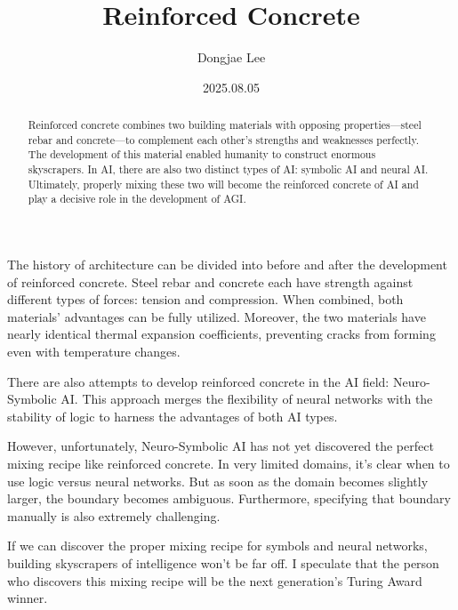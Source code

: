 \documentclass[11pt, oneside]{article}
\title{Reinforced Concrete}
\author{Dongjae Lee}
\date{2025.08.05}
\begin{document}
\maketitle
\begin{abstract}
	Reinforced concrete combines two building materials with opposing properties—steel rebar and concrete—to complement each other's strengths and weaknesses perfectly.
	The development of this material enabled humanity to construct enormous skyscrapers.
	In AI, there are also two distinct types of AI: symbolic AI and neural AI.
	Ultimately, properly mixing these two will become the reinforced concrete of AI and play a decisive role in the development of AGI.
\end{abstract}

The history of architecture can be divided into before and after the development of reinforced concrete.
Steel rebar and concrete each have strength against different types of forces: tension and compression.
When combined, both materials' advantages can be fully utilized.
Moreover, the two materials have nearly identical thermal expansion coefficients, preventing cracks from forming even with temperature changes.

There are also attempts to develop reinforced concrete in the AI field: Neuro-Symbolic AI. 
This approach merges the flexibility of neural networks with the stability of logic to harness the advantages of both AI types.

However, unfortunately, Neuro-Symbolic AI has not yet discovered the perfect mixing recipe like reinforced concrete.
In very limited domains, it's clear when to use logic versus neural networks.
But as soon as the domain becomes slightly larger, the boundary becomes ambiguous.
Furthermore, specifying that boundary manually is also extremely challenging.

If we can discover the proper mixing recipe for symbols and neural networks, building skyscrapers of intelligence won't be far off.
I speculate that the person who discovers this mixing recipe will be the next generation's Turing Award winner.
\end{document}
